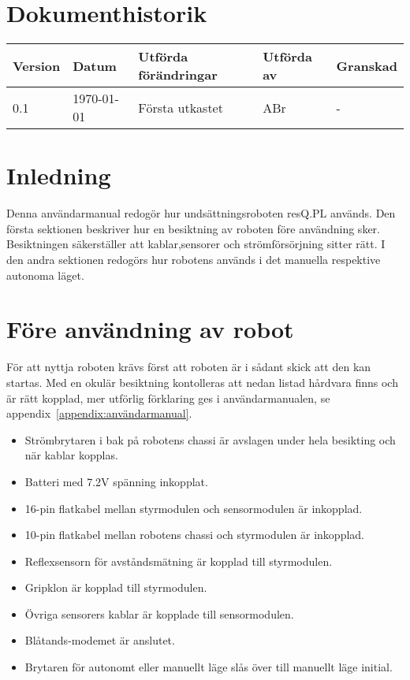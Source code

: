 \documentclass[11pt]{article}
\begin{document}
\tableofcontents

\pagebreak

\section*{Dokumenthistorik}
\begin{table}[h]
\begin{tabular}{|l|l|l|l|l|} \hline

Version & 
Datum & 
Utförda förändringar & 
Utförda av & 
Granskad \\[0.1in] \hline
0.1 &
\today & 
Första utkastet & 
ABr & 
- \\ \hline


\end{tabular}
\end{table}


\pagebreak



\section{Inledning}
Denna användarmanual redogör hur undsättningsroboten resQ.PL används. Den första sektionen beskriver hur en besiktning av roboten före användning sker. Besiktningen säkerställer att kablar,sensorer och strömförsörjning sitter rätt.  I den andra sektionen redogörs hur robotens används i det manuella respektive autonoma läget. 

\pagebreak    


\section{Före användning av robot}
För att nyttja roboten krävs först att roboten är i sådant skick att den kan startas. Med en okulär besiktning kontolleras att nedan listad hårdvara finns och är rätt kopplad, mer utförlig förklaring ges i användarmanualen, se appendix~\ref{appendix:användarmanual}. 


\begin{itemize}
\item Strömbrytaren i bak på robotens chassi är avslagen under hela besikting och när kablar kopplas.
\item Batteri med 7.2V spänning inkopplat. 
\item 16-pin flatkabel mellan styrmodulen och sensormodulen är inkopplad.
\item 10-pin flatkabel mellan robotens chassi och styrmodulen är inkopplad.
\item Reflexsensorn för avståndsmätning är kopplad till styrmodulen.
\item Gripklon är kopplad till styrmodulen.
\item Övriga sensorers kablar är kopplade till sensormodulen.
\item Blåtands-modemet är anslutet.
\item Brytaren för autonomt eller manuellt läge slås över till manuellt läge initial.
\end{itemize}
\end{document}
